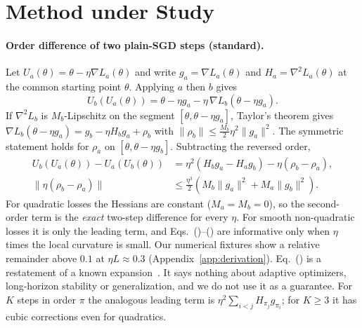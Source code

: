 \section{Method under Study}
\label{sec:analysis}

\paragraph{Order difference of two plain-SGD steps (standard).} Let $U_a(\theta)=\theta-\eta\nabla L_a(\theta)$
and write $g_a=\nabla L_a(\theta)$ and $H_a=\nabla^2 L_a(\theta)$ at the common starting point $\theta$.
Applying $a$ then $b$ gives
\begin{equation}
U_b(U_a(\theta)) = \theta-\eta g_a-\eta\,\nabla L_b(\theta-\eta g_a).
\label{eq:composition}
\end{equation}
If $\nabla^2 L_b$ is $M_b$-Lipschitz on the segment $[\theta,\theta-\eta g_a]$, Taylor's theorem gives
$\nabla L_b(\theta-\eta g_a)=g_b-\eta H_b g_a+\rho_b$ with $\|\rho_b\|\le \tfrac{M_b}{2}\eta^2\|g_a\|^2$.
The symmetric statement holds for $\rho_a$ on $[\theta,\theta-\eta g_b]$. Subtracting the reversed order,
\begin{align}
U_b(U_a(\theta))-U_a(U_b(\theta)) &= \eta^2\left(H_b g_a - H_a g_b\right) - \eta(\rho_b-\rho_a),
\label{eq:twostep}\\
\|\eta(\rho_b-\rho_a)\| &\le \tfrac{\eta^3}{2}\left(M_b\|g_a\|^2+M_a\|g_b\|^2\right).
\label{eq:remainder}
\end{align}
For quadratic losses the Hessians are constant ($M_a=M_b=0$), so the second-order term is the \emph{exact}
two-step difference for every $\eta$. For smooth non-quadratic losses it is only the leading term, and
Eqs.~()--() are informative only when $\eta$ times the local curvature is small. Our numerical
fixtures show a relative remainder above $0.1$ at $\eta L\approx 0.3$ (Appendix~\ref{app:derivation}).
Eq.~() is a restatement of a known expansion~\citep{nichol2018reptile,smith2021origin,sweeney2026lie}.
It says nothing about adaptive optimizers, long-horizon stability or generalization, and we do not use it
as a guarantee. For $K$ steps in order $\pi$ the analogous leading term is
$\eta^2\sum_{i<j}H_{\pi_j}g_{\pi_i}$; for $K\ge 3$ it has cubic corrections even for quadratics.

